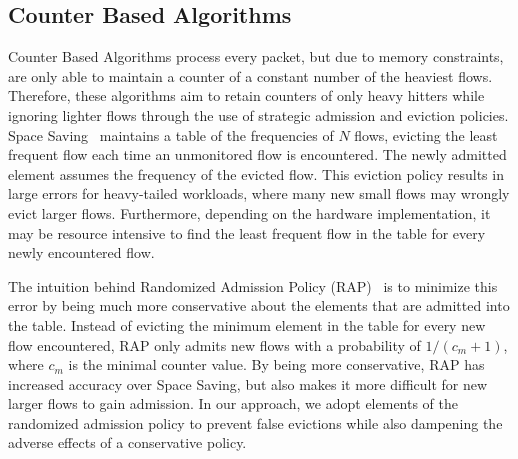 \subsection{Counter Based Algorithms}
Counter Based Algorithms process every packet, but due to memory constraints, are only able to maintain a counter of a constant number of the heaviest flows. Therefore, these algorithms aim to retain counters of only heavy hitters while ignoring lighter flows through the use of strategic admission and eviction policies. Space Saving~\cite{spacesaving} maintains a table of the frequencies of $N$ flows, evicting the least frequent flow each time an unmonitored flow is encountered. The newly admitted element assumes the frequency of the evicted flow. This eviction policy results in large errors for heavy-tailed workloads, where many new small flows may wrongly evict larger flows. Furthermore, depending on the hardware implementation, it may be resource intensive to find the least frequent flow in the table for every newly encountered flow. 

The intuition behind Randomized Admission Policy (RAP)~\cite{rap} is to minimize this error by being much more conservative about the elements that are admitted into the table. Instead of evicting the minimum element in the table for every new flow encountered, RAP only admits new flows with a probability of $1/(c_m + 1)$, where $c_m$ is the minimal counter value. By being more conservative, RAP has increased accuracy over Space Saving, but also makes it more difficult for new larger flows to gain admission. In our approach, we adopt elements of the randomized admission policy to prevent false evictions while also dampening the adverse effects of a conservative policy. 

